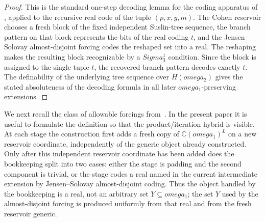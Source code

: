 \documentclass{article}
\theoremstyle{remark}
\theoremstyle{plain}
\def\Sigma{Sigma}%
\def\omega{omega}%
\begin{document}
\begin{proof}
This is the standard one-step decoding lemma for the coding apparatus of
\cite{HOFFELNER2023103292}, applied to the recursive real code of the tuple
$(p,x,y,m)$. The Cohen reservoir chooses a fresh block of the fixed independent
Suslin-tree sequence, the branch pattern on that block represents the bits of the
real coding $t$, and the Jensen--Solovay almost-disjoint forcing codes the
reshaped set into a real. The reshaping makes the resulting block recognizable
by a $\Sigma^1_3$ condition. Since the block is assigned to the single tuple
$t$, the recovered branch pattern decodes exactly $t$. The definability of the
underlying tree sequence over $H(\omega_2)$ gives the stated absoluteness of the
decoding formula in all later $\omega_1$-preserving extensions.
\end{proof}

We next recall the class of allowable forcings from~\cite{HOFFELNER2023103292}. In the present paper it is useful to formulate the definition so that the product/iteration hybrid is visible. At each stage the construction first adds a fresh copy of \(\mathbb C(\omega_1)^L\) on a new reservoir coordinate, independently of the generic object already constructed. Only after this independent reservoir coordinate has been added does the bookkeeping split into two cases: either the stage is padding and the second component is trivial, or the stage codes a real named in the current intermediate extension by Jensen--Solovay almost-disjoint coding. Thus the object handled by the bookkeeping is a real, not an arbitrary set \(Y\subseteq\omega_1\); the set \(Y\) used by the almost-disjoint forcing is produced uniformly from that real and from the fresh reservoir generic.
\end{document}
